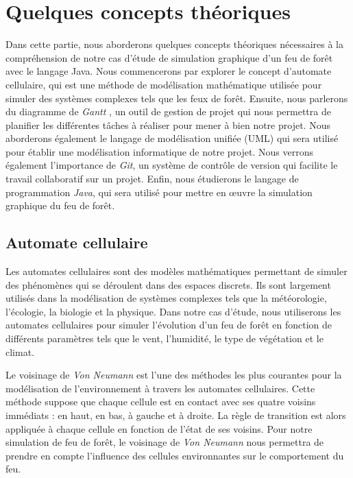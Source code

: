 \section{Quelques concepts théoriques}

Dans cette partie, nous aborderons quelques concepts théoriques nécessaires à la compréhension de notre cas d'étude de simulation graphique d'un feu de forêt avec le langage Java. Nous commencerons par explorer le concept d'automate cellulaire, qui est une méthode de modélisation mathématique utilisée pour simuler des systèmes complexes tels que les feux de forêt. Ensuite, nous parlerons du diagramme de \textit{\textit{Gantt} }, un outil de gestion de projet qui nous permettra de planifier les différentes tâches à réaliser pour mener à bien notre projet. Nous aborderons également le langage de modélisation unifiée (UML) qui sera utilisé pour établir une modélisation informatique de notre projet. Nous verrons également l'importance de \textit{Git}, un système de contrôle de version qui facilite le travail collaboratif sur un projet. Enfin, nous étudierons le langage de programmation \textit{Java}, qui sera utilisé pour mettre en œuvre la simulation graphique du feu de forêt.

\subsection{Automate cellulaire}

Les automates cellulaires sont des modèles mathématiques permettant de simuler des phénomènes qui se déroulent dans des espaces discrets.\parencite{wuensche2000cellular} Ils sont largement utilisés dans la modélisation de systèmes complexes tels que la météorologie, l'écologie, la biologie et la physique. Dans notre cas d'étude, nous utiliserons les automates cellulaires pour simuler l'évolution d'un feu de forêt en fonction de différents paramètres tels que le vent, l'humidité, le type de végétation et le climat.

Le voisinage de \textit{Von Neumann} est l'une des méthodes les plus courantes pour la modélisation de l'environnement à travers les automates cellulaires.\parencite{franceschini2020cellular} Cette méthode suppose que chaque cellule est en contact avec ses quatre voisins immédiats : en haut, en bas, à gauche et à droite. La règle de transition est alors appliquée à chaque cellule en fonction de l'état de ses voisins. Pour notre simulation de feu de forêt, le voisinage de \textit{Von Neumann} nous permettra de prendre en compte l'influence des cellules environnantes sur le comportement du feu.

